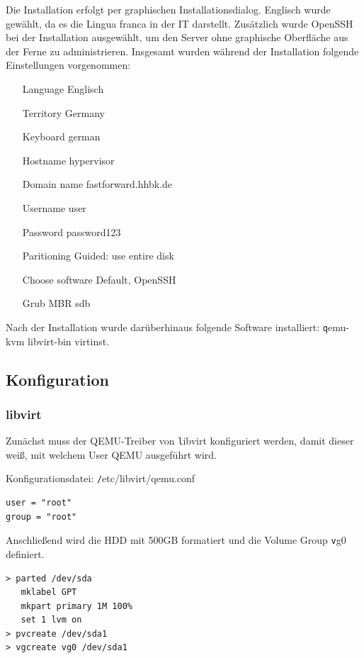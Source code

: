 Die Installation erfolgt per graphischen Installationsdialog. Englisch wurde gewählt, da es die Lingua franca in der IT darstellt. Zusätzlich wurde OpenSSH bei der Installation ausgewählt, um den Server ohne graphische Oberfläche aus der Ferne zu administrieren. Insgesamt wurden während der Installation folgende Einstellungen vorgenommen:
\begin{itemize}
	\item[Language] Englisch
	\item[Territory] Germany
	\item[Keyboard] german
	\item[Hostname] hypervisor
	\item[Domain name] fastforward.hhbk.de
	\item[Username] user
	\item[Password] password123
	\item[Paritioning] Guided: use entire disk
	\item[Choose software] Default, OpenSSH
	\item[Grub MBR] sdb
\end{itemize}

Nach der Installation wurde darüberhinaus folgende Software installiert: {\texttt qemu-kvm libvirt-bin virtinst}.

\subsection{Konfiguration}

\subsubsection{libvirt}

Zunächst muss der QEMU-Treiber von {\texttt libvirt} konfiguriert werden, damit dieser weiß, mit welchem User QEMU ausgeführt wird. 

Konfigurationsdatei: {\texttt /etc/libvirt/qemu.conf}
\begin{lstlisting}
user = "root"
group = "root"
\end{lstlisting}

Anschließend wird die HDD mit 500GB formatiert und die Volume Group {\texttt vg0} definiert.

\begin{lstlisting}[numbers=none]
> parted /dev/sda
   mklabel GPT
   mkpart primary 1M 100%
   set 1 lvm on
> pvcreate /dev/sda1
> vgcreate vg0 /dev/sda1
\end{lstlisting} 

